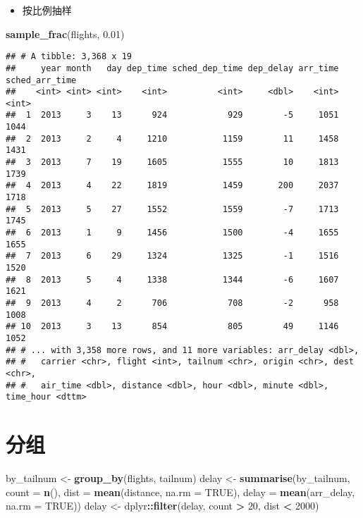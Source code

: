 \documentclass[
]{article}
\newenvironment{Shaded}{\begin{snugshade}}{\end{snugshade}}
\newcommand{\DataTypeTok}[1]{\textcolor[rgb]{0.13,0.29,0.53}{#1}}
\newcommand{\DecValTok}[1]{\textcolor[rgb]{0.00,0.00,0.81}{#1}}
\newcommand{\FloatTok}[1]{\textcolor[rgb]{0.00,0.00,0.81}{#1}}
\newcommand{\KeywordTok}[1]{\textcolor[rgb]{0.13,0.29,0.53}{\textbf{#1}}}
\newcommand{\NormalTok}[1]{#1}
\newcommand{\OperatorTok}[1]{\textcolor[rgb]{0.81,0.36,0.00}{\textbf{#1}}}
\newcommand{\OtherTok}[1]{\textcolor[rgb]{0.56,0.35,0.01}{#1}}
\newcommand{\StringTok}[1]{\textcolor[rgb]{0.31,0.60,0.02}{#1}}
\providecommand{\tightlist}{%
  \setlength{\itemsep}{0pt}\setlength{\parskip}{0pt}}
\begin{document}
\begin{itemize}
\tightlist
\item
  按比例抽样
\end{itemize}

\begin{Shaded}
\begin{Highlighting}[]
\KeywordTok{sample_frac}\NormalTok{(flights, }\FloatTok{0.01}\NormalTok{)}
\end{Highlighting}
\end{Shaded}

\begin{verbatim}
## # A tibble: 3,368 x 19
##     year month   day dep_time sched_dep_time dep_delay arr_time sched_arr_time
##    <int> <int> <int>    <int>          <int>     <dbl>    <int>          <int>
##  1  2013     3    13      924            929        -5     1051           1044
##  2  2013     2     4     1210           1159        11     1458           1431
##  3  2013     7    19     1605           1555        10     1813           1739
##  4  2013     4    22     1819           1459       200     2037           1718
##  5  2013     5    27     1552           1559        -7     1713           1745
##  6  2013     1     9     1456           1500        -4     1655           1655
##  7  2013     6    29     1324           1325        -1     1516           1520
##  8  2013     5     4     1338           1344        -6     1607           1621
##  9  2013     4     2      706            708        -2      958           1008
## 10  2013     3    13      854            805        49     1146           1052
## # ... with 3,358 more rows, and 11 more variables: arr_delay <dbl>,
## #   carrier <chr>, flight <int>, tailnum <chr>, origin <chr>, dest <chr>,
## #   air_time <dbl>, distance <dbl>, hour <dbl>, minute <dbl>, time_hour <dttm>
\end{verbatim}

\hypertarget{ux5206ux7ec4}{%
\section{分组}\label{ux5206ux7ec4}}

\begin{Shaded}
\begin{Highlighting}[]
\NormalTok{by_tailnum <-}\StringTok{ }\KeywordTok{group_by}\NormalTok{(flights, tailnum)}
\NormalTok{delay <-}\StringTok{ }\KeywordTok{summarise}\NormalTok{(by_tailnum,}
  \DataTypeTok{count =} \KeywordTok{n}\NormalTok{(),}
  \DataTypeTok{dist =} \KeywordTok{mean}\NormalTok{(distance, }\DataTypeTok{na.rm =} \OtherTok{TRUE}\NormalTok{),}
  \DataTypeTok{delay =} \KeywordTok{mean}\NormalTok{(arr_delay, }\DataTypeTok{na.rm =} \OtherTok{TRUE}\NormalTok{))}
\NormalTok{delay <-}\StringTok{ }\NormalTok{dplyr}\OperatorTok{::}\KeywordTok{filter}\NormalTok{(delay, count }\OperatorTok{>}\StringTok{ }\DecValTok{20}\NormalTok{, dist }\OperatorTok{<}\StringTok{ }\DecValTok{2000}\NormalTok{)}
\end{Highlighting}
\end{Shaded}
\end{document}
